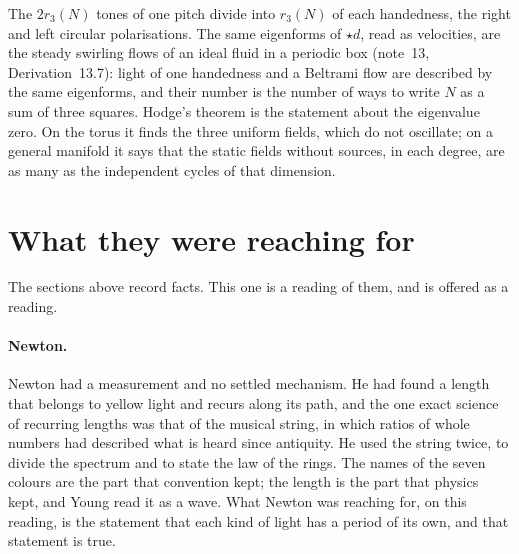 \documentclass[11pt]{article}
\begin{document}
\physical
The $2r_3(N)$ tones of one pitch divide into $r_3(N)$ of each handedness, the right and left circular polarisations.
The same eigenforms of ${\star}d$, read as velocities, are the steady swirling flows of an ideal fluid in a periodic box (note~13, Derivation~13.7): light of one handedness and a Beltrami flow are described by the same eigenforms, and their number is the number of ways to write $N$ as a sum of three squares.
Hodge's theorem is the statement about the eigenvalue zero.
On the torus it finds the three uniform fields, which do not oscillate; on a general manifold it says that the static fields without sources, in each degree, are as many as the independent cycles of that dimension.

\section{What they were reaching for}\label{s:reaching}

The sections above record facts.
This one is a reading of them, and is offered as a reading.

\paragraph{Newton.}
Newton had a measurement and no settled mechanism.
He had found a length that belongs to yellow light and recurs along its path, and the one exact science of recurring lengths was that of the musical string, in which ratios of whole numbers had described what is heard since antiquity.
He used the string twice, to divide the spectrum and to state the law of the rings.
The names of the seven colours are the part that convention kept; the length is the part that physics kept, and Young read it as a wave.
What Newton was reaching for, on this reading, is the statement that each kind of light has a period of its own, and that statement is true.
\end{document}
